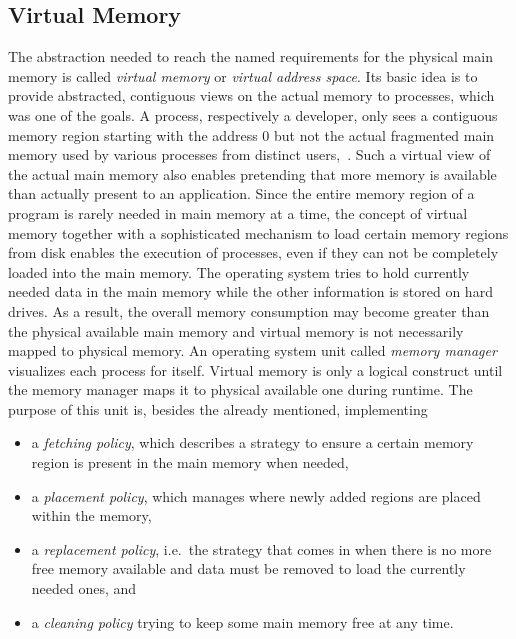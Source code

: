 \subsection{Virtual Memory}
The abstraction needed to reach the named requirements for the physical main memory is called \textit{virtual memory} or \textit{virtual address space}.
Its basic idea is to provide abstracted, contiguous views on the actual memory to processes, which was one of the goals.
A process, respectively a developer, only sees a contiguous memory region starting with the address 0 but not the actual fragmented main memory used by various processes from distinct users\cite{mandl2014Grundkurs},~\cite{brause2017betriebssysteme}.
Such a virtual view of the actual main memory also enables pretending that more memory is available than actually present to an application.
Since the entire memory region of a program is rarely needed in main memory at a time, the concept of virtual memory together with a sophisticated mechanism to load certain memory regions from disk enables the execution of processes, even if they can not be completely loaded into the main memory.
The operating system tries to hold currently needed data in the main memory while the other information is stored on hard drives.
As a result, the overall memory consumption may become greater than the physical available main memory and virtual memory is not necessarily mapped to physical memory\cite{mandl2014Grundkurs}.
An operating system unit called \textit{memory manager} visualizes each process for itself.
Virtual memory is only a logical construct until the memory manager maps it to physical available one during runtime.
The purpose of this unit is, besides the already mentioned, implementing
\begin{itemize}
    \item a \textit{fetching policy}, which describes a strategy to ensure a certain memory region is present in the main memory when needed,
    \item a \textit{placement policy}, which manages where newly added regions are placed within the memory,
    \item a \textit{replacement policy}, i.e.\ the strategy that comes in when there is no more free memory available and data must be removed to load the currently needed ones, and
    \item a \textit{cleaning policy} trying to keep some main memory free at any time\cite{mandl2014Grundkurs}.
\end{itemize}
